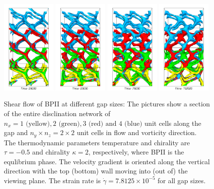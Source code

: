\documentclass[12pt,twoside]{iopart}
\newcommand{\ex}[1]{\times10^{#1}}
\begin{document}
\begin{figure}[t]
\centering
\includegraphics[width=0.24\textwidth]{bp2_t-0o5_k2_25k_y.png}
\includegraphics[width=0.24\textwidth]{bp2_t-0o5_k2_50k_y.png}
\includegraphics[width=0.24\textwidth]{bp2_t-0o5_k2_75k_y.png}
\includegraphics[width=0.24\textwidth]{bp2_t-0o5_k2_100k_y.png}
\caption{Shear flow of BPII at different gap sizes: The pictures show a section of the entire disclination network of $n_x=1 \mbox{ (yellow)}, 2 \mbox{ (green)}, 3 \mbox{ (red) and } 4 \mbox{ (blue)}$ unit cells along the gap and $n_y \times n_z =2 \times 2$ unit cells in flow and vorticity direction. The thermodynamic parameters temperature and chirality are $\tau=-0.5$ and chirality $\kappa=2$, respectively, where BPII is the equlibrium phase. The velocity gradient is oriented along the vertical direction with the top (bottom) wall moving into (out of) the viewing plane. The strain rate is $\dot{\gamma}=7.8125\ex{-5}$ for all gap sizes.}
\label{fig1}
\end{figure}
\end{document}
